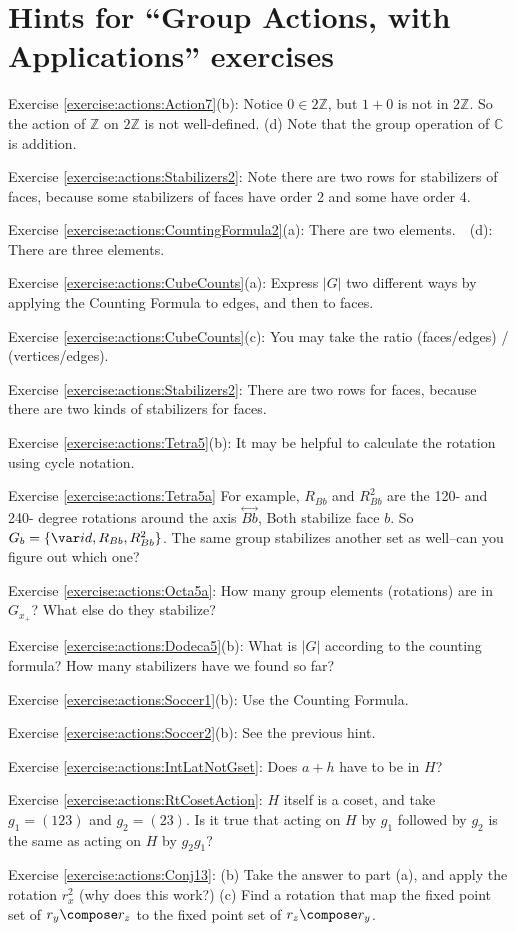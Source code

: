 \section{Hints for ``Group Actions, with Applications'' exercises}
\label{sec:GroupActions:Hints} 


\noindent Exercise \ref{exercise:actions:Action7}(b): Notice $0 \in 2\mathbb{Z}$, but $1+0$ is not in $2\mathbb{Z}$. So the action of $\mathbb{Z}$ on $2\mathbb{Z}$ is not well-defined. (d) Note that the group operation of $\mathbb{C}$ is addition.

\noindent Exercise \ref{exercise:actions:Stabilizers2}: Note there are two rows for stabilizers of faces, because some stabilizers of faces have order 2 and some have order 4.

\noindent Exercise \ref{exercise:actions:CountingFormula2}(a):   There are two elements.~~(d):   There are three elements.

\noindent Exercise \ref{exercise:actions:CubeCounts}(a):   Express $|G|$ two different ways by applying the Counting Formula to edges, and then to faces.

\noindent Exercise \ref{exercise:actions:CubeCounts}(c):  You may take the ratio (faces/edges) / (vertices/edges).

\noindent Exercise \ref{exercise:actions:Stabilizers2}:   There are two rows for faces, because there are two kinds of stabilizers for faces.

\noindent Exercise \ref{exercise:actions:Tetra5}(b): It may be helpful to calculate the rotation using cycle notation.

\noindent Exercise \ref{exercise:actions:Tetra5a} For example, $R_{Bb}$ and  $R_{Bb}^2$ are the 120- and 240- degree rotations around the axis $\overset{\leftrightarrow}{Bb}$, Both stabilize face $b$. So 
$G_b = \{ {\var id}, R_{Bb}, R_{Bb}^2 \}$. The same group stabilizes another set as well--can you figure out which one?  


\noindent Exercise \ref{exercise:actions:Octa5a}: How many group elements (rotations) are in $G_{x_+}$?  What else do they stabilize?

\noindent Exercise \ref{exercise:actions:Dodeca5}(b): What is $|G|$ according to the counting formula?  How many stabilizers have we found so far?

\noindent Exercise \ref{exercise:actions:Soccer1}(b): Use the Counting Formula.

\noindent Exercise \ref{exercise:actions:Soccer2}(b): See the previous hint.

\noindent Exercise \ref{exercise:actions:IntLatNotGset}: Does $a+h$ have to be in $H$?

\noindent Exercise \ref{exercise:actions:RtCosetAction}: $H$ itself is a coset, and take $g_1=(123)$ and $g_2=(23)$.  Is it true that acting on $H$ by $g_1$ followed by $g_2$ is the same as acting on $H$ by $g_2 g_1$?

\noindent Exercise \ref{exercise:actions:Conj13}: (b) Take the answer to part (a), and apply the rotation $r_x^2$ (why does this work?)  (c) Find a rotation that map the fixed point set of $r_y\compose r_z$ to the fixed point set of  $r_z\compose r_y$.
